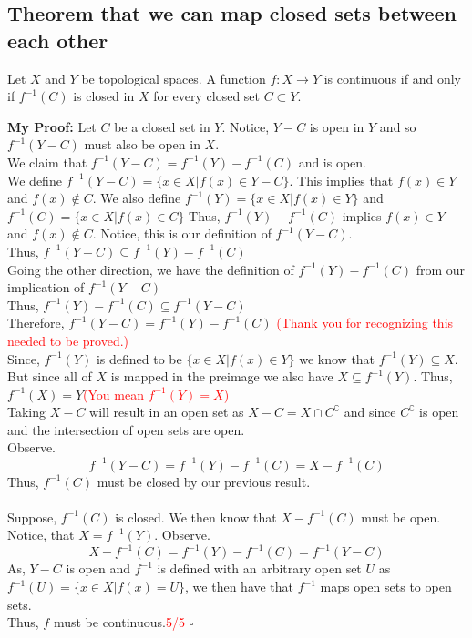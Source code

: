 \documentclass[12pt]{article}
\newcommand{\w}[1]{\textcolor{red}{#1}}
\newenvironment{proofed}[1][]{\par \medskip \noindent \textbf{#1 Proof: }}{\hfill$\square$}
\begin{document}
	\subsection{Theorem that we can map closed sets between each other}
		Let $X$ and $Y$ be topological spaces. A function $f : X \rightarrow Y$ is continuous if and only if $f ^ { - 1 } ( C )$ is closed in $X$ for every closed set $C \subset Y .$
		\begin{proofed}[My]
			Let $ C $ be a closed set in $ Y $. Notice, $ Y - C$ is open in $ Y $ and so $ f^{-1}(Y-C) $ must also be open in $ X $. \\
			We claim that $ f^{-1}(Y-C)=f^{-1}(Y)-f^{-1}(C) $ and is open.\\
			We define $ f^{-1}(Y-C) = \{x\in X| f(x)\in Y-C \} $. This implies that $ f(x)\in Y $ and $ f(x)\not \in C $. We also define $ f^{-1}(Y)=\{x\in X|f(x)\in Y \} $ and $ f^{-1}(C)=\{x\in X| f(x)\in C\} $ Thus, $ f^{-1}(Y)-f^{-1}(C) $ implies $ f(x)\in Y $ and $ f(x)\not\in C $. Notice, this is our definition of $f^{-1}(Y-C)$.\\
			Thus, $ f^{-1}(Y-C) \subseteq f^{-1}(Y)-f^{-1}(C)  $\\
			Going the other direction, we have the definition of $f^{-1}(Y)-f^{-1}(C) $ from our implication of $ f^{-1}(Y-C) $\\
			Thus, $ f^{-1}(Y)-f^{-1}(C) \subseteq f^{-1}(Y-C) $\\
			Therefore,  $ f^{-1}(Y-C)=f^{-1}(Y)-f^{-1}(C) $ \w{(Thank you for recognizing this needed to be proved.) }\\
			Since, $ f^{-1}(Y) $ is defined to be $ \{x\in X| f(x)\in Y\} $ we know that $ f^{-1}(Y)\subseteq X $. But since all of $ X $ is mapped in the preimage we also have $ X\subseteq f^{-1}(Y) $. Thus, $ f^{-1}(X)=Y $\w{(You mean $ f^{-1}(Y)=X $)}\\
			Taking $ X-C $ will result in an open set as $ X-C=X\cap C^\complement $ and since $ C^\complement $ is open and the intersection of open sets are open.\\
			Observe.
			\[f^{-1}(Y-C)=f^{-1}(Y)-f^{-1}(C)=X-f^{-1}(C)\]
			Thus, $ f^{-1}(C) $ must be closed by our previous result.\\
			\\
			Suppose, $ f^{-1}(C) $ is closed. We then know that $X-f^{-1}(C)$ must be open. Notice, that $ X=f^{-1}(Y) $. Observe. 
			\[X-f^{-1}(C) = f^{-1}(Y)-f^{-1}(C) = f^{-1}(Y-C) \]
			As, $ Y - C $ is open and $ f^{-1}$ is defined with an arbitrary open set $ U $ as $ f^{-1}(U)=\{x\in X| f(x)=U\} $, we then have that $ f^{-1} $ maps open sets to open sets.\\
			Thus, $ f $ must be continuous.\w{5/5 }
		\end{proofed}
\end{document}
